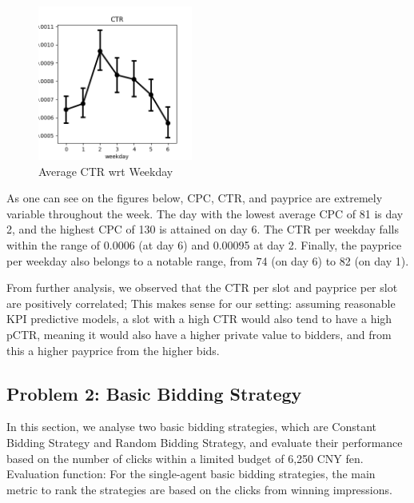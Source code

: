\documentclass{sig-alternate-05-2015}
\begin{document}
\begin{figure}
\centering
\includegraphics[height=2in, width=2in]{images/weekday_CTR.png}
\caption{Average CTR wrt Weekday}
\end{figure}

As one can see on the figures below, CPC, CTR, and payprice are extremely variable throughout the week.
The day with the lowest average CPC of 81 is day 2, and the highest CPC of 130 is attained on day 6.
The CTR per weekday falls within the range of 0.0006 (at day 6) and 0.00095 at day 2.
Finally, the payprice per weekday also belongs to a notable range, from 74 (on day 6) to 82 (on day 1).

From further analysis, we observed that the CTR per slot and payprice per slot are positively correlated;
This makes sense for our setting: assuming reasonable KPI predictive models, a slot with a high CTR would also tend to have a high pCTR,
meaning it would also have a higher private value to bidders, and from this a higher payprice from the higher bids.





\subsection{Problem 2: Basic Bidding Strategy}
In this section, we analyse two basic bidding strategies, which are Constant Bidding Strategy and Random Bidding Strategy, and evaluate their performance based on the number of clicks within a limited budget of 6,250 CNY fen. 
Evaluation function: For the single-agent basic bidding strategies, the main metric to rank the strategies are based on the clicks from winning impressions.
\end{document}
